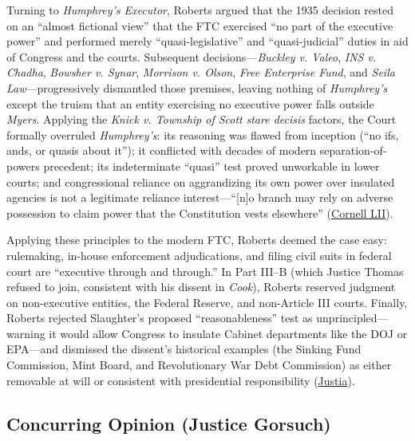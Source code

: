\documentclass[12pt]{article}
\begin{document}
Turning to \textit{Humphrey's Executor}, Roberts argued that the 1935 decision rested on an ``almost fictional view'' that the FTC exercised ``no part of the executive power'' and performed merely ``quasi-legislative'' and ``quasi-judicial'' duties in aid of Congress and the courts. Subsequent decisions---\textit{Buckley v. Valeo}, \textit{INS v. Chadha}, \textit{Bowsher v. Synar}, \textit{Morrison v. Olson}, \textit{Free Enterprise Fund}, and \textit{Seila Law}---progressively dismantled those premises, leaving nothing of \textit{Humphrey's} except the truism that an entity exercising no executive power falls outside \textit{Myers}. Applying the \textit{Knick v. Township of Scott} \textit{stare decisis} factors, the Court formally overruled \textit{Humphrey's}: its reasoning was flawed from inception (``no ifs, ands, or quasis about it''); it conflicted with decades of modern separation-of-powers precedent; its indeterminate ``quasi'' test proved unworkable in lower courts; and congressional reliance on aggrandizing its own power over insulated agencies is not a legitimate reliance interest---``[n]o branch may rely on adverse possession to claim power that the Constitution vests elsewhere'' (\href{https://www.law.cornell.edu/supremecourt/text/25-332}{Cornell LII}).

Applying these principles to the modern FTC, Roberts deemed the case easy: rulemaking, in-house enforcement adjudications, and filing civil suits in federal court are ``executive through and through.'' In Part III--B (which Justice Thomas refused to join, consistent with his dissent in \textit{Cook}), Roberts reserved judgment on non-executive entities, the Federal Reserve, and non-Article III courts. Finally, Roberts rejected Slaughter's proposed ``reasonableness'' test as unprincipled---warning it would allow Congress to insulate Cabinet departments like the DOJ or EPA---and dismissed the dissent's historical examples (the Sinking Fund Commission, Mint Board, and Revolutionary War Debt Commission) as either removable at will or consistent with presidential responsibility (\href{https://supreme.justia.com/cases/federal/us/609/25-332/}{Justia}).

\subsection{Concurring Opinion (Justice Gorsuch)}
\end{document}
